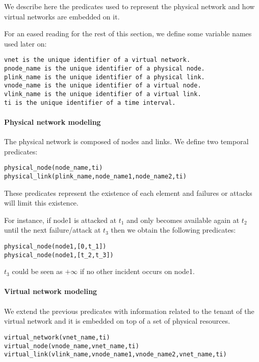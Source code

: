 We describe here the predicates used to represent the physical network and how virtual networks are embedded on it.

For an eased reading for the rest of this section, we define some variable names used later on:

\begin{lstlisting}[backgroundcolor = \color{lightgray}]
vnet is the unique identifier of a virtual network.
pnode_name is the unique identifier of a physical node.
plink_name is the unique identifier of a physical link.
vnode_name is the unique identifier of a virtual node.
vlink_name is the unique identifier of a virtual link.
ti is the unique identifier of a time interval.
\end{lstlisting}

\paragraph{Physical network modeling}


The physical network is composed of nodes and links. We define two temporal predicates:

\begin{lstlisting}[backgroundcolor = \color{lightgray}]
physical_node(node_name,ti)
physical_link(plink_name,node_name1,node_name2,ti)
\end{lstlisting}

These predicates represent the existence of each element and failures or attacks will limit this existence.

For instance, if node1 is attacked at $t_1$ and only becomes available again at $t_2$ until the next failure/attack at $t_3$ then we obtain the following predicates:

\begin{lstlisting}[backgroundcolor = \color{lightgray}]
physical_node(node1,[0,t_1])
physical_node(node1,[t_2,t_3])
\end{lstlisting}

$t_3$ could be seen as $+\infty$ if no other incident occurs on node1.

\paragraph{Virtual network modeling}
We extend the previous predicates with information related to the tenant of the virtual network and it is embedded on top of a set of physical resources.


\begin{lstlisting}[backgroundcolor = \color{lightgray}]
virtual_network(vnet_name,ti)
virtual_node(vnode_name,vnet_name,ti)
virtual_link(vlink_name,vnode_name1,vnode_name2,vnet_name,ti)
\end{lstlisting}

